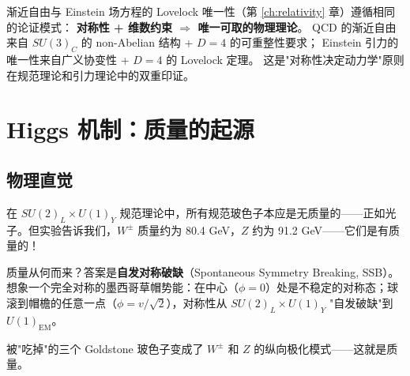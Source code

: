 \begin{center}
\end{center}

\begin{notebox}
  渐近自由与 Einstein 场方程的 Lovelock 唯一性（第 \ref{ch:relativity} 章）遵循相同的论证模式：
  \textbf{对称性 + 维数约束 $\Rightarrow$ 唯一可取的物理理论}。
  QCD 的渐近自由来自 $SU(3)_C$ 的 non-Abelian 结构 + $D=4$ 的可重整性要求；
  Einstein 引力的唯一性来自广义协变性 + $D=4$ 的 Lovelock 定理。
  这是"对称性决定动力学"原则在规范理论和引力理论中的双重印证。
\end{notebox}

\section{Higgs 机制：质量的起源}

\subsection{物理直觉}

在 $SU(2)_L\times U(1)_Y$ 规范理论中，所有规范玻色子本应是无质量的——正如光子。但实验告诉我们，$W^\pm$ 质量约为 80.4 GeV，$Z$ 约为 91.2 GeV——它们是有质量的！

质量从何而来？答案是\textbf{自发对称破缺}（Spontaneous Symmetry Breaking, SSB）。想象一个完全对称的墨西哥草帽势能：在中心（$\phi = 0$）处是不稳定的对称态；球滚到帽檐的任意一点（$\phi = v/\sqrt{2}$），对称性从 $SU(2)_L\times U(1)_Y$ "自发破缺"到 $U(1)_{\text{EM}}$。

被"吃掉"的三个 Goldstone 玻色子变成了 $W^\pm$ 和 $Z$ 的纵向极化模式——这就是质量。

